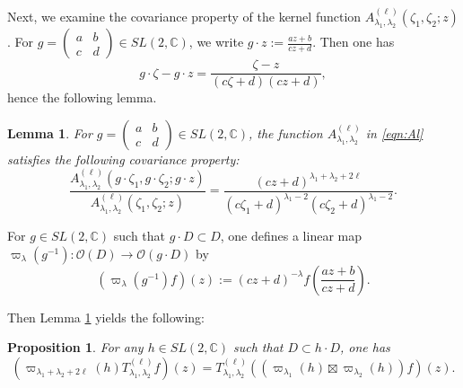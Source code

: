 \documentclass[12pt]{amsart}
\theoremstyle{plain} %
\newtheorem{proposition}{Proposition}%
\newtheorem{lemma}{Lemma} %
\theoremstyle{definition} %
\theoremstyle{remark} %
\begin{document}
Next, 
we examine the covariance property of the kernel function 
 $A_{\lambda_1,\lambda_2}^{(\ell)}(\zeta_1, \zeta_2; z)$.  
For $g =\begin{pmatrix} a & b \\ c & d \end{pmatrix} \in SL(2,{\mathbb{C}})$, 
 we write
$
  g \cdot z :=\frac{a z + b}{c z +d}
$.  
Then one has 
\begin{equation}
\label{eqn:gz}
  g \cdot \zeta- g \cdot z
  =
  \frac{\zeta-z}{(c \zeta+d)(c z+ d)},
\end{equation}
hence the following lemma.  



\begin{lemma}
\label{lem:23122107}
For $g=\begin{pmatrix} a & b \\ c & d\end{pmatrix} \in S L(2,{\mathbb{C}})$, 
 the function $A_{\lambda_1,\lambda_2}^{(\ell)}$ 
 in \eqref{eqn:Al} satisfies the following covariance property:
\[
  \frac{A_{\lambda_1,\lambda_2}^{(\ell)}(g \cdot\zeta_1, g \cdot\zeta_2;g\cdot z)}
       {A_{\lambda_1,\lambda_2}^{(\ell)}(\zeta_1, \zeta_2;z)}
  =
  \frac{(c z + d)^{\lambda_1+\lambda_2+2 \ell}}
       {(c \zeta_1 + d)^{\lambda_1-2}(c \zeta_2 + d)^{\lambda_1-2}}.  
\]
\end{lemma}



For $g \in SL(2,{\mathbb{C}})$
 such that $g \cdot D \subset D$, 
 one defines a linear map 
$\varpi_{\lambda}(g^{-1}) \colon {\mathcal{O}}(D) \to {\mathcal{O}}(g \cdot D)$
 by 
\begin{equation}
\label{eqn:pilmd}
  (\varpi_{\lambda}(g^{-1})f)(z):=(c z + d)^{-\lambda} f(\frac{az+b}{cz+d}).  
\end{equation}



Then Lemma \ref{lem:23122107} yields the following:
\begin{proposition}
\label{prop:23122108}
For any $h \in SL(2,{\mathbb{C}})$ 
 such that $D \subset h \cdot D$, 
 one has
\[
  (\varpi_{\lambda_1+\lambda_2+2\ell}(h) T_{\lambda_1,\lambda_2}^{(\ell)} f)(z)
  =T_{\lambda_1,\lambda_2}^{(\ell)}((\varpi_{\lambda_1}(h) \boxtimes \varpi_{\lambda_2}(h))f)(z).  
\]
\end{proposition}
\end{document}
